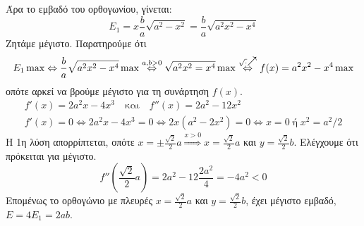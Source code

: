 \begin{solution}
    Άρα το εμβαδό του ορθογωνίου, γίνεται:
    \[
      E_{1}=x  \frac{b}{a} \sqrt{ a^{2}-x^{2}} = \frac{b}{a} \sqrt{a^{2}x^{2}-x^{4}}
    \]
  Ζητάμε μέγιστο. Παρατηρούμε ότι 
  \[ 
    E_{1} \max \Leftrightarrow
    \frac{b}{a} \sqrt{a^{2}x^{2}-x^{4}} \max \overset{a,b>0}{\Leftrightarrow}
    \sqrt{a^{2}x^{2}=x^{4}} \max
    \overset{\sqrt{\cdot}\raisebox{1pt}{$\nearrow$}}{\Leftrightarrow} 
    f(x)=a^{2}x^{2}-x^{4} \max 
  \] 
  οπότε αρκεί να βρούμε μέγιστο για τη συνάρτηση $ f(x) $.
  \begin{gather*}
    f'(x)=2a^{2}x-4x^{3} \quad \text{και} \quad f''(x)=2a^{2}-12x^{2} \\
    f'(x)=0 \Leftrightarrow 2a^{2}x-4x^{3}=0 \Leftrightarrow 2x(a^{2}-2x^{2})=0
    \Leftrightarrow x = 0 \; \text{ή} \; x^{2}= a^{2}/2
  \end{gather*} 
  Η 1η λύση απορρίπτεται, οπότε $ x= \pm \frac{\sqrt{2}}{2} a \overset{x>0}{\Rightarrow}
  x = \frac{\sqrt{2}}{2} a $ και $ y= \frac{\sqrt{2}}{2} b $. Ελέγχουμε ότι πρόκειται 
  για μέγιστο.
  \[
    f''\left(\frac{\sqrt{2}}{2} a\right) = 2a^{2}-12 \frac{2a^{2}}{4} = - 4a^{2}<0
  \] 
  Επομένως το ορθογώνιο με πλευρές $ x= \frac{\sqrt{2}}{2} a $ και $ y =
  \frac{\sqrt{2}}{2} b $, έχει μέγιστο εμβαδό, $ E=4E_{1} = 2ab $.
\end{solution}

